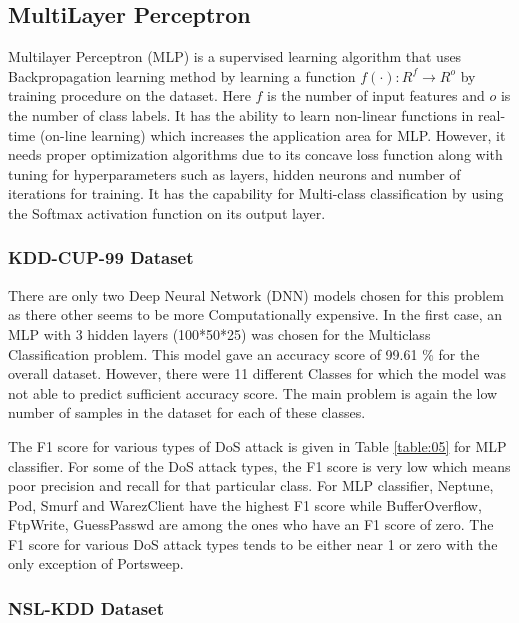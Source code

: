 \documentclass[conference]{IEEEtran}
\begin{document}
\subsection{MultiLayer Perceptron}
Multilayer Perceptron \cite{MLP} (MLP) is a supervised learning algorithm that uses Backpropagation learning method \cite{MLP} by learning a function $ f(\cdot): R^{f} \rightarrow R^{o}$ by training procedure on the dataset. Here $f$ is the number of input features and $o$ is the number of class labels. It has the ability to learn non-linear functions in real-time (on-line learning) which increases the application area for MLP. However, it needs proper optimization algorithms due to its concave loss function along with tuning for hyperparameters such as layers, hidden neurons and number of iterations for training. It has the capability for Multi-class classification by using the Softmax activation function on its output layer. 

\subsubsection{KDD-CUP-99 Dataset}

There are only two Deep Neural Network (DNN) models chosen for this problem as there other seems to be more Computationally expensive. In the first case, an MLP with 3 hidden layers (100*50*25) was chosen for the Multiclass Classification problem. This model gave an accuracy score of 99.61 \% for the overall dataset. However, there were 11 different Classes for which the model was not able to predict sufficient accuracy score. The main problem is again the low number of samples in the dataset for each of these classes.\par

The F1 score for various types of DoS attack is given in Table \ref{table:05} for MLP classifier. For some of the DoS attack types, the F1 score is very low which means poor precision and recall for that particular class. For MLP classifier, Neptune, Pod, Smurf and WarezClient have the highest F1 score while BufferOverflow, FtpWrite, GuessPasswd are among the ones who have an F1 score of zero. The F1 score for various DoS attack types tends to be either near 1 or zero with the only exception of Portsweep.   

\subsubsection{NSL-KDD Dataset}
\end{document}
